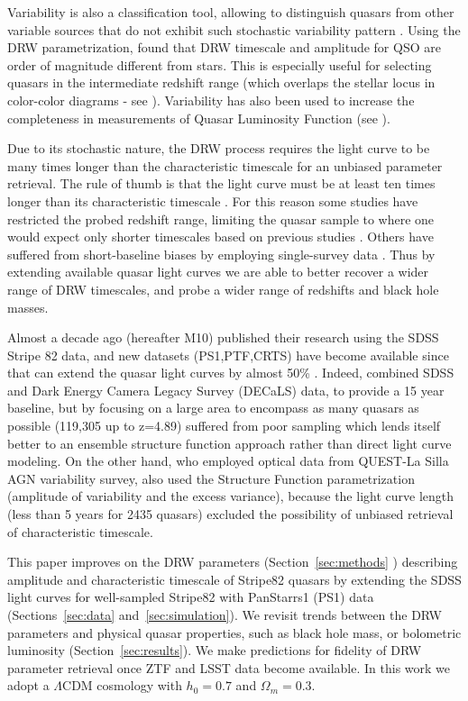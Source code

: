 \documentclass[twocolumn]{aastex62}
\begin{document}
Variability is also a classification tool, allowing to distinguish quasars from other variable sources that do not exhibit such stochastic variability pattern \citep{macleod2011}. Using the DRW parametrization, \citep{macleod2011} found that DRW timescale and amplitude for QSO are order of  magnitude different from stars. This is especially useful for selecting quasars in the intermediate redshift range (which overlaps the stellar locus in color-color diagrams - see \citealt{sesar2007, yang2017}). Variability has also been used to increase the completeness in measurements of Quasar Luminosity Function (see \citealt{ ross2013, palanque2013, alsayyad2016, mcgreer2013, mcgreer2018}). 

Due to its stochastic nature, the DRW process requires the light curve to be many times longer than the characteristic timescale for an unbiased parameter retrieval. The rule of thumb is that the light curve must be at least ten times longer than its characteristic timescale \citep{kozlowski2010, kozlowski2017a}. For this reason some studies have restricted the probed redshift range, limiting the quasar sample to where one would expect only shorter timescales based on previous studies \citep{sun2018, guo2017}. Others have suffered from short-baseline biases by employing single-survey data \citep{hernitschek2016}.
Thus by extending available quasar light curves we are able to better recover a wider range of DRW timescales, and probe a wider range of redshifts and black hole masses. 


Almost a decade ago \citet{macleod2010} (hereafter M10) published their research using the SDSS Stripe 82 data, and new datasets (PS1,PTF,CRTS) have become available since that can extend the quasar light curves by almost 50\% .  Indeed, \citep{li2018} combined SDSS and Dark Energy Camera Legacy Survey (DECaLS) data, to provide a 15 year baseline, but by focusing on a large area to encompass as many quasars as possible (119,305 up to z=4.89) suffered from poor sampling which lends itself better to an ensemble structure function approach rather than direct light curve modeling. On the other hand, \citep{sanchez2018} who employed optical data from QUEST-La Silla AGN variability survey, also used the Structure Function parametrization (amplitude of variability and the excess variance), because the light curve length (less than 5 years for 2435 quasars)  excluded the possibility of unbiased retrieval of characteristic timescale. 


 This paper improves on the DRW parameters (Section~\ref{sec:methods} ) describing amplitude and characteristic timescale of Stripe82 quasars by extending the SDSS light curves for well-sampled Stripe82 with PanStarrs1 (PS1) data (Sections~\ref{sec:data} and~\ref{sec:simulation}). We revisit trends between  the DRW parameters and physical quasar properties, such as black hole mass, or bolometric luminosity (Section~\ref{sec:results}). We make predictions for fidelity of DRW parameter retrieval once ZTF and LSST data become available. In this work we adopt a $\Lambda $CDM cosmology with $h_{0} = 0.7$ and $\Omega_{m} = 0.3 $. 
\end{document}
